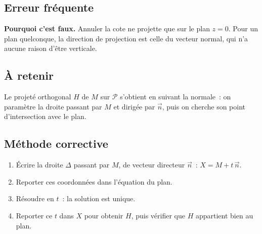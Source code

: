 

\subsection*{Erreur fréquente}


\textbf{Pourquoi c'est faux.} Annuler la cote ne projette que sur le plan
$z=0$. Pour un plan quelconque, la direction de projection est celle du
vecteur normal, qui n'a aucune raison d'être verticale.


\subsection*{À retenir}

Le projeté orthogonal $H$ de $M$ sur $\mathcal{P}$ s'obtient en suivant la
normale~: on paramètre la droite passant par $M$ et dirigée par $\vec{n}$,
puis on cherche son point d'intersection avec le plan.

\subsection*{Méthode corrective}

\begin{enumerate}
  \item Écrire la droite $\Delta$ passant par $M$, de vecteur directeur
        $\vec{n}$~: $X=M+t\,\vec{n}$.
  \item Reporter ces coordonnées dans l'équation du plan.
  \item Résoudre en $t$~: la solution est unique.
  \item Reporter ce $t$ dans $X$ pour obtenir $H$, puis vérifier que $H$
        appartient bien au plan.
\end{enumerate}

